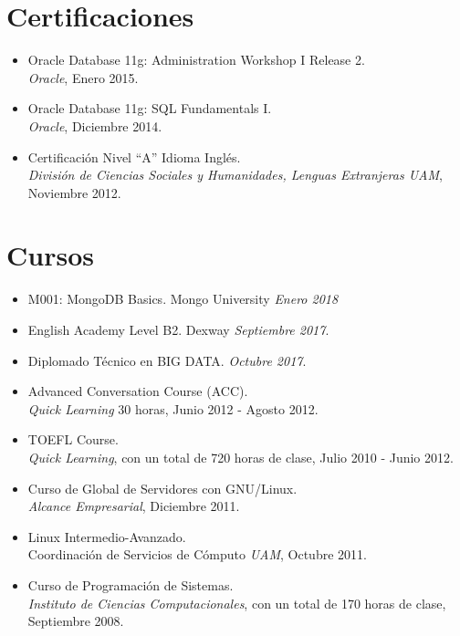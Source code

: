 \documentclass[21pt, onecolumn]{article} %
\begin{document}
\section*{Certificaciones}
\begin{itemize}
 \item Oracle Database 11g: Administration Workshop I Release 2.\\
 \emph{Oracle},
Enero 2015. %
 \item Oracle Database 11g: SQL Fundamentals I.\\
 \emph{Oracle},
Diciembre 2014. %
 \item Certificación Nivel ``A'' Idioma Inglés.\\
 \emph{División de Ciencias Sociales y Humanidades, Lenguas Extranjeras UAM},
Noviembre 2012.
\end{itemize}

\section*{Cursos}
\begin{itemize}
\item M001: MongoDB Basics. Mongo University
\emph{Enero 2018}
\item English Academy Level B2. Dexway
\emph{Septiembre 2017}.
 \item Diplomado Técnico en BIG DATA.
 \emph{Octubre 2017}.
 \item Advanced Conversation Course (ACC).\\
 \emph{Quick Learning} 30 horas, Junio 2012 - Agosto 2012.
 \item TOEFL Course.\\
 \emph{Quick Learning}, con un total de 720 horas de clase, Julio 2010 - Junio
2012.
 \item Curso de Global de Servidores con GNU/Linux.\\
  \emph{Alcance Empresarial}, Diciembre 2011.
 \item Linux Intermedio-Avanzado.\\
  Coordinación de Servicios de Cómputo \emph{UAM}, Octubre 2011.
  \item Curso de Programación de Sistemas.\\
  \emph{Instituto de Ciencias Computacionales}, con un total de 170 horas de
clase, Septiembre 2008.

\end{itemize}
\end{document}
